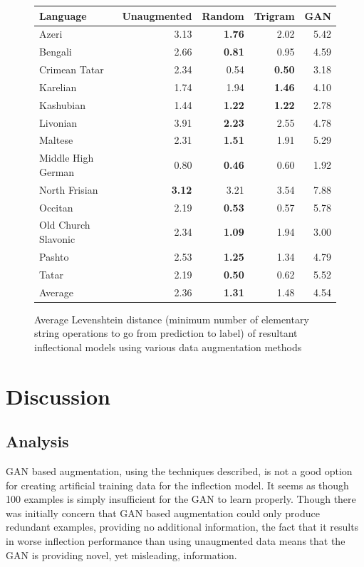 \documentclass{article}
\begin{document}
      \begin{figure}[H]
        \center
        \begin{tabular}{lrrrr}
          \toprule
          Language & Unaugmented & Random & Trigram & GAN \\
          \midrule
          Azeri & 3.13 & \textbf{1.76} & 2.02 & 5.42 \\
          Bengali & 2.66 & \textbf{0.81} & 0.95 & 4.59 \\
          Crimean Tatar & 2.34 & 0.54 & \textbf{0.50} & 3.18 \\
          Karelian & 1.74 & 1.94 & \textbf{1.46} & 4.10 \\
          Kashubian & 1.44 & \textbf{1.22} & \textbf{1.22} & 2.78 \\
          Livonian & 3.91 & \textbf{2.23} & 2.55 & 4.78 \\
          Maltese & 2.31 & \textbf{1.51} & 1.91 & 5.29 \\
          Middle High German & 0.80 & \textbf{0.46} & 0.60 & 1.92 \\
          North Frisian & \textbf{3.12} & 3.21 & 3.54 & 7.88 \\
          Occitan & 2.19 & \textbf{0.53} & 0.57 & 5.78 \\
          Old Church Slavonic & 2.34 & \textbf{1.09} & 1.94 & 3.00 \\
          Pashto & 2.53 & \textbf{1.25} & 1.34 & 4.79\\
          Tatar & 2.19 & \textbf{0.50} & 0.62 & 5.52\\
          \midrule
          Average & 2.36 & \textbf{1.31} & 1.48 & 4.54\\
          \bottomrule
        \end{tabular}
        \caption{Average Levenshtein distance (minimum number of elementary string operations to go from prediction to label) of resultant inflectional models using various data augmentation methods}
        \label{fig:lev}
      \end{figure}
  \section{Discussion}
    \subsection{Analysis}
      GAN based augmentation, using the techniques described, is not a good option for creating artificial training data for the inflection model. It seems as though 100 examples is simply insufficient for the GAN to learn properly. Though there was initially concern that GAN based augmentation could only produce redundant examples, providing no additional information, the fact that it results in worse inflection performance than using unaugmented data means that the GAN is providing novel, yet misleading, information.
      
\end{document}
